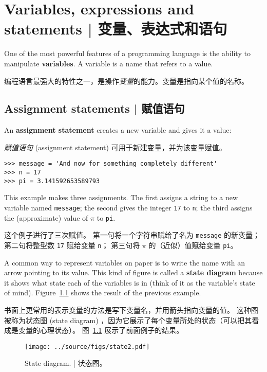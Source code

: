 


\chapter{Variables, expressions and statements  |  变量、表达式和语句}

One of the most powerful features of a programming language is the
ability to manipulate {\bf variables}.  A variable is a name that
refers to a value.

编程语言最强大的特性之一，是操作\emph{变量}的能力。变量是指向某个值的名称。
  


\section{Assignment statements  |  赋值语句}
\label{variables}
  

An {\bf assignment statement} creates a new variable and gives
it a value:

\emph{赋值语句} (assignment statement) 可用于新建变量，并为该变量赋值。

\begin{lstlisting}
>>> message = 'And now for something completely different'
>>> n = 17
>>> pi = 3.141592653589793
\end{lstlisting}
%
This example makes three assignments.  The first assigns a string
to a new variable named {\tt message};
the second gives the integer {\tt 17} to {\tt n}; the third
assigns the (approximate) value of $\pi$ to {\tt pi}.

这个例子进行了三次赋值。 第一句将一个字符串赋给了名为 \lstinline{message} 的新变量； 第二句将整型数 \lstinline{17} 赋给变量 \lstinline{n}； 第三句将 $\pi$ 的（近似）值赋给变量 \lstinline{pi}。
  

A common way to represent variables on paper is to write the name with
an arrow pointing to its value.  This kind of figure is
called a {\bf state diagram} because it shows what state each of the
variables is in (think of it as the variable's state of mind).
Figure~\ref{fig.state2} shows the result of the previous example.

书面上更常用的表示变量的方法是写下变量名，并用箭头指向变量的值。 这种图被称为状态图 (state diagram) ，因为它展示了每个变量所处的状态（可以把其看成是变量的心理状态）。 图~\ref{fig.state2} 展示了前面例子的结果。

\begin{figure}
\centerline
{\texttt{[image: ../source/figs/state2.pdf]}}
\caption{State diagram.  |  状态图。}
\label{fig.state2}
\end{figure}



